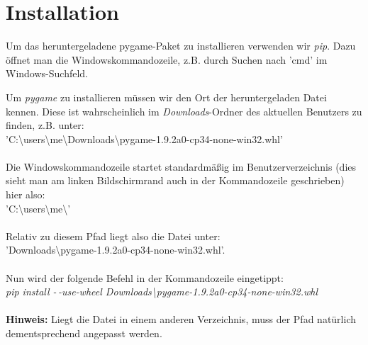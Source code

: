 \documentclass[ngerman,oneside, a4letter]{article}
\begin{document}
\section{Installation}
Um das heruntergeladene pygame-Paket zu installieren verwenden wir \emph{pip}.
Dazu öffnet man die Windowskommandozeile, z.B. durch Suchen nach 'cmd' im Windows-Suchfeld.

\begin{center}
	\end{center}


\pagebreak

\noindent Um \emph{pygame} zu installieren müssen wir den Ort der heruntergeladen Datei kennen. Diese ist wahrscheinlich im \emph{Downloads}-Ordner des aktuellen Benutzers zu finden, z.B. unter:
\\
'C:\textbackslash users\textbackslash me\textbackslash Downloads\textbackslash pygame-1.9.2a0-cp34-none-win32.whl'
\\
\\
Die Windowskommandozeile startet standardmäßig im Benutzerverzeichnis (dies sieht man am linken Bildschirmrand auch in der Kommandozeile geschrieben) hier also:
\\
'C:\textbackslash users\textbackslash me\textbackslash'
\\
\\
Relativ zu diesem Pfad liegt also die Datei unter:
\\'Downloads\textbackslash pygame-1.9.2a0-cp34-none-win32.whl'. 
\\
\\
Nun wird der folgende Befehl in der Kommandozeile eingetippt:
\\
\emph{pip install -\,-use-wheel Downloads\textbackslash pygame-1.9.2a0-cp34-none-win32.whl}
\\
\\
\textbf{Hinweis:} Liegt die Datei in einem anderen Verzeichnis, muss der Pfad natürlich dementsprechend angepasst werden.
\end{document}
